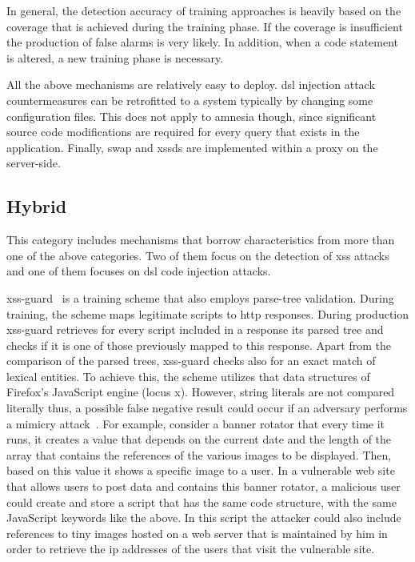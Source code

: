 \documentclass[conference]{IEEEtran}
\begin{document}
In general, the detection accuracy of training approaches is
heavily based on the coverage that is achieved during the
training phase. If the coverage is insufficient the
production of false alarms is very likely.
In addition, when a code statement is altered, a new
training phase is necessary.

All the above mechanisms are relatively easy to deploy.
{\sc dsl} injection attack countermeasures
can be retrofitted to a system typically by changing
some configuration files. This does not apply
to {\sc amnesia} though, since significant source code
modifications are required for every query that exists
in the application. Finally, {\sc swap} and {\sc xssds}
are implemented within a proxy on the server-side.

\subsection{Hybrid}
\label{sec:hybrid}

This category includes mechanisms that borrow
characteristics from more than one of the above categories.
Two of them focus on the detection of {\sc xss}
attacks and one of them focuses on {\sc dsl} code
injection attacks.

{\sc xss-guard}~\cite{BV08} is a training scheme
that also employs parse-tree validation.
During training, the scheme maps legitimate scripts
to {\sc http} responses. During production
{\sc xss-guard} retrieves for every script included
in a response its parsed tree and checks if it
is one of those previously mapped to this response.
Apart from the comparison of the parsed trees, {\sc xss-guard}
checks also for an exact match of lexical entities.
To achieve this, the scheme utilizes that data structures
of Firefox's JavaScript engine (locus {\sc x}).
However, string literals are not compared literally
thus, a possible false negative result could occur if an
adversary performs a mimicry attack~\cite{WS02}.
For example, consider a banner rotator that
every time it runs, it creates a value that depends on
the current date and the length of the array that
contains the references of the various images to be displayed.
Then, based on this value it shows a specific
image to a user. In a vulnerable web site that allows
users to post data and contains this banner
rotator, a malicious user could create and store a script
that has the same code structure, with the same JavaScript
keywords like the above. In this script the
attacker could also include references to tiny
images hosted on a web server that is maintained by him in order
to retrieve the {\sc ip} addresses of the
users that visit the vulnerable site.
\end{document}
